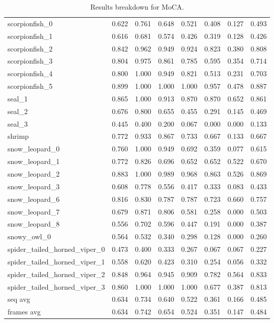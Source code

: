 \begin{table*}[]
\begin{tabular}{l|c|cccccc}
scorpionfish\_0 & 0.622 & 0.761 & 0.648 & 0.521 & 0.408 & 0.127 & 0.493 \\
scorpionfish\_1 & 0.616 & 0.681 & 0.574 & 0.426 & 0.319 & 0.128 & 0.426 \\
scorpionfish\_2 & 0.842 & 0.962 & 0.949 & 0.924 & 0.823 & 0.380 & 0.808 \\
scorpionfish\_3 & 0.804 & 0.975 & 0.861 & 0.785 & 0.595 & 0.354 & 0.714 \\
scorpionfish\_4 & 0.800 & 1.000 & 0.949 & 0.821 & 0.513 & 0.231 & 0.703 \\
scorpionfish\_5 & 0.899 & 1.000 & 1.000 & 1.000 & 0.957 & 0.478 & 0.887 \\
seal\_1 & 0.865 & 1.000 & 0.913 & 0.870 & 0.870 & 0.652 & 0.861 \\
seal\_2 & 0.676 & 0.800 & 0.655 & 0.455 & 0.291 & 0.145 & 0.469 \\
seal\_3 & 0.445 & 0.400 & 0.200 & 0.067 & 0.000 & 0.000 & 0.133 \\
shrimp & 0.772 & 0.933 & 0.867 & 0.733 & 0.667 & 0.133 & 0.667 \\
snow\_leopard\_0 & 0.760 & 1.000 & 0.949 & 0.692 & 0.359 & 0.077 & 0.615 \\
snow\_leopard\_1 & 0.772 & 0.826 & 0.696 & 0.652 & 0.652 & 0.522 & 0.670 \\
snow\_leopard\_2 & 0.883 & 1.000 & 0.989 & 0.968 & 0.863 & 0.526 & 0.869 \\
snow\_leopard\_3 & 0.608 & 0.778 & 0.556 & 0.417 & 0.333 & 0.083 & 0.433 \\
snow\_leopard\_6 & 0.816 & 0.830 & 0.787 & 0.787 & 0.723 & 0.660 & 0.757 \\
snow\_leopard\_7 & 0.679 & 0.871 & 0.806 & 0.581 & 0.258 & 0.000 & 0.503 \\
snow\_leopard\_8 & 0.556 & 0.702 & 0.596 & 0.447 & 0.191 & 0.000 & 0.387 \\
snowy\_owl\_0 & 0.564 & 0.532 & 0.340 & 0.298 & 0.128 & 0.000 & 0.260 \\
spider\_tailed\_horned\_viper\_0 & 0.473 & 0.400 & 0.333 & 0.267 & 0.067 & 0.067 & 0.227 \\
spider\_tailed\_horned\_viper\_1 & 0.558 & 0.620 & 0.423 & 0.310 & 0.254 & 0.056 & 0.332 \\
spider\_tailed\_horned\_viper\_2 & 0.848 & 0.964 & 0.945 & 0.909 & 0.782 & 0.564 & 0.833 \\
spider\_tailed\_horned\_viper\_3 & 0.860 & 1.000 & 1.000 & 1.000 & 0.677 & 0.387 & 0.813 \\ \hline
seq avg & 0.634 &	0.734 &	0.640 &	0.522 &	0.361 &	0.166 &	0.485 \\
frames avg & 0.634 & 0.742 & 0.654 & 0.524 & 0.351 & 0.147 & 0.484
\end{tabular}
\caption{Results breakdown for MoCA.}
\label{tab:moca2}
\end{table*}

